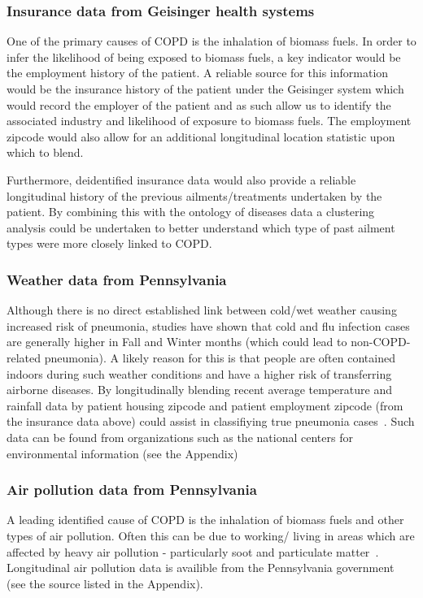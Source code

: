 \documentclass{article}
\begin{document}
\subsubsection{Insurance data from Geisinger health systems}

\noindent One of the primary causes of COPD is the inhalation of biomass fuels. In order to infer the likelihood of being exposed to biomass fuels, a key indicator would be the employment history of the patient. A reliable source for this information would be the insurance history of the patient under the Geisinger system which would record the employer of the patient and as such allow us to identify the associated industry and likelihood of exposure to biomass fuels. The employment zipcode would also allow for an additional longitudinal location statistic upon which to blend.

Furthermore, deidentified insurance data would also provide a reliable longitudinal history of the previous ailments/treatments undertaken by the patient. By combining this with the ontology of diseases data a clustering analysis could be undertaken to better understand which type of past ailment types were more closely linked to COPD.


\subsubsection{Weather data from Pennsylvania}
Although there is no direct established link between cold/wet weather causing increased risk of pneumonia, studies have shown that cold and flu infection cases are generally higher in Fall and Winter months (which could lead to non-COPD-related pneumonia). A likely reason for this is that people are often contained indoors during such weather conditions and have a higher risk of transferring airborne diseases. By longitudinally  blending recent average temperature and rainfall data by patient housing zipcode and patient employment zipcode (from the insurance 
data above) could assist in classifiying true pneumonia cases~\cite{mccoy_health_2008}. Such data can be found from organizations such as the national centers for environmental information (see the Appendix)

\subsubsection{Air pollution data from Pennsylvania}
A leading identified cause of COPD is the inhalation of biomass fuels and other types of air pollution. Often this can be due to working/ living in areas which are affected by heavy air pollution - particularly soot and particulate matter~\cite{who_who_2014}. Longitudinal air pollution data is availible from the Pennsylvania government (see the source listed in the Appendix).
\end{document}
